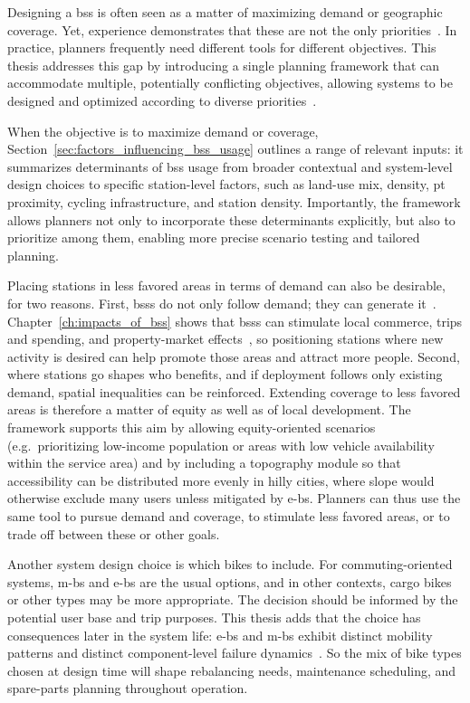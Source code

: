 Designing a \ac{bss} is often seen as a matter of maximizing demand or geographic coverage. Yet, experience demonstrates that these are not the only priorities~\cite{Yanocha2018}. In practice, planners frequently need different tools for different objectives. This thesis addresses this gap by introducing a single planning framework that can accommodate multiple, potentially conflicting objectives, allowing systems to be designed and optimized according to diverse priorities~\cite{GrauEscolano2025}. 

When the objective is to maximize demand or coverage, Section~\ref{sec:factors_influencing_bss_usage} outlines a range of relevant inputs: it summarizes determinants of \ac{bss} usage from broader contextual and system-level design choices to specific station-level factors, such as land-use mix, density, \ac{pt} proximity, cycling infrastructure, and station density. Importantly, the framework allows planners not only to incorporate these determinants explicitly, but also to prioritize among them, enabling more precise scenario testing and tailored planning.

Placing stations in less favored areas in terms of demand can also be desirable, for two reasons. First, \acp{bss} do not only follow demand; they can generate it~\cite{Bosehans2024}. Chapter~\ref{ch:impacts_of_bss} shows that \acp{bss} can stimulate local commerce, trips and spending, and property-market effects~\cite{Schoner2012, Buehler2014, ElGeneidy2016}, so positioning stations where new activity is desired can help promote those areas and attract more people. Second, where stations go shapes who benefits, and if deployment follows only existing demand, spatial inequalities can be reinforced. Extending coverage to less favored areas is therefore a matter of equity as well as of local development. The framework supports this aim by allowing equity-oriented scenarios (e.g.\ prioritizing low-income population or areas with low vehicle availability within the service area) and by including a topography module so that accessibility can be distributed more evenly in hilly cities, where slope would otherwise exclude many users unless mitigated by \acp{e-b}. Planners can thus use the same tool to pursue demand and coverage, to stimulate less favored areas, or to trade off between these or other goals.

Another system design choice is which bikes to include. For commuting-oriented systems, \acp{m-b} and \acp{e-b} are the usual options, and in other contexts, cargo bikes or other types may be more appropriate. The decision should be informed by the potential user base and trip purposes. This thesis adds that the choice has consequences later in the system life: \acp{e-b} and \acp{m-b} exhibit distinct mobility patterns and distinct component-level failure dynamics~\cite{Grau-Escolano2024}. So the mix of bike types chosen at design time will shape rebalancing needs, maintenance scheduling, and spare-parts planning throughout operation.

